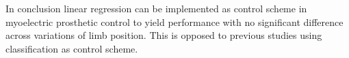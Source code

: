 

In conclusion linear regression can be implemented as control scheme in myoelectric prosthetic control to yield performance with no significant difference across variations of limb position. This is opposed to previous studies using classification as control scheme. 


	

